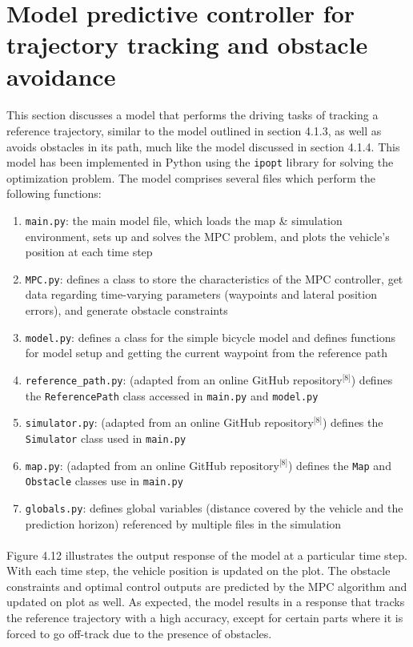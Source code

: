 \section{Model predictive controller for trajectory tracking and obstacle avoidance}
\paragraph{}
This section discusses a model that performs the driving tasks of tracking a reference trajectory, similar to the model outlined in section 4.1.3, as well as avoids obstacles in its path, much like the model discussed in section 4.1.4. This model has been implemented in Python using the \texttt{ipopt} library for solving the optimization problem. The model comprises several files which perform the following functions:
\begin{enumerate}[label = (\roman*), itemsep=-0.3em]
    \item \texttt{main.py}: the main model file, which loads the map \& simulation environment, sets up and solves the MPC problem, and plots the vehicle's position at each time step
    \item \texttt{MPC.py}: defines a class to store the characteristics of the MPC controller, get data regarding time-varying parameters (waypoints and lateral position errors), and generate obstacle constraints
    \item \texttt{model.py}: defines a class for the simple bicycle model and defines functions for model setup and getting the current waypoint from the reference path
    \item \texttt{reference\_path.py}: (adapted from an online GitHub repository$^{\text{[8]}}$) defines the \texttt{ReferencePath} class accessed in \texttt{main.py} and \texttt{model.py}
    \item \texttt{simulator.py}: (adapted from an online GitHub repository$^{\text{[8]}}$) defines the \texttt{Simulator} class used in \texttt{main.py}
    \item \texttt{map.py}: (adapted from an online GitHub repository$^{\text{[8]}}$) defines the \texttt{Map} and \texttt{Obstacle} classes use in \texttt{main.py}
    \item \texttt{globals.py}: defines global variables (distance covered by the vehicle and the prediction horizon) referenced by multiple files in the simulation
\end{enumerate}

\paragraph{}
Figure 4.12 illustrates the output response of the model at a particular time step. With each time step, the vehicle position is updated on the plot. The obstacle constraints and optimal control outputs are predicted by the MPC algorithm and updated on plot as well. As expected, the model results in a response that tracks the reference trajectory with a high accuracy, except for certain parts where it is forced to go off-track due to the presence of obstacles.

